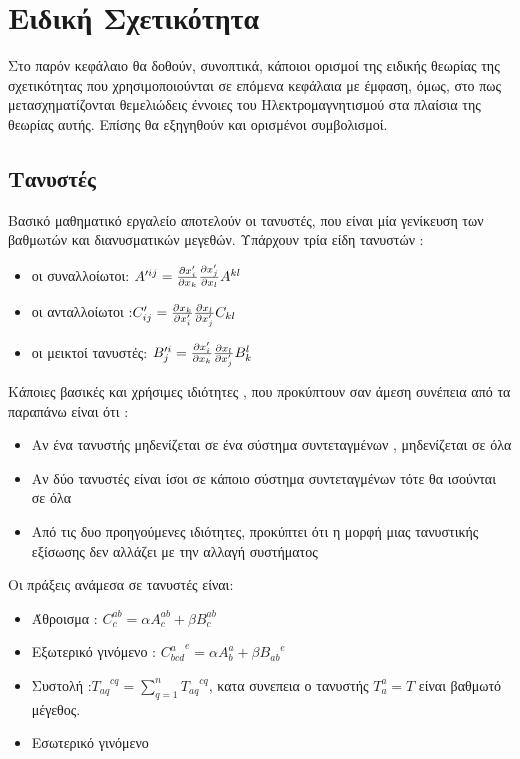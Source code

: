 \section{Ειδική Σχετικότητα}

Στο παρόν κεφάλαιο θα δοθούν, συνοπτικά, κάποιοι ορισμοί της ειδικής θεωρίας της σχετικότητας που χρησιμοποιούνται σε επόμενα κεφάλαια με έμφαση, όμως, στο  πως μετασχηματίζονται θεμελιώδεις έννοιες του Ηλεκτρομαγνητισμού στα πλαίσια της θεωρίας αυτής. Επίσης θα εξηγηθούν και ορισμένοι συμβολισμοί. 

\subsection{Τανυστές}


Βασικό μαθηματικό εργαλείο αποτελούν οι τανυστές, που είναι μία γενίκευση των βαθμωτών και διανυσματικών μεγεθών. Υπάρχουν τρία είδη τανυστών :

\begin{itemize}
\item οι συναλλοίωτοι: $ A'^{ij} = \frac{\partial x'_i }{\partial x_k} \frac{\partial x'_j}{\partial x_l} A^{kl} $
\item οι ανταλλοίωτοι :$ C'_{ij} = \frac{\partial x_k}{\partial x'_i} \frac{\partial x_l}{\partial x'_j}C_{kl}$ 
\item οι μεικτοί τανυστές: $ B'^i_j  =\frac{\partial x'_i }{\partial x_k} \frac{\partial x_l}{\partial x'_j} B^l_k  $
\end{itemize}

Κάποιες βασικές και χρήσιμες ιδιότητες , που προκύπτουν σαν άμεση συνέπεια από τα παραπάνω είναι ότι :

\begin{itemize}
\item Αν ένα τανυστής μηδενίζεται σε ένα σύστημα συντεταγμένων , μηδενίζεται σε όλα 
\item Αν δύο τανυστές είναι ίσοι σε κάποιο σύστημα συντεταγμένων τότε θα ισούνται σε όλα 
\item Από τις δυο προηγούμενες ιδιότητες, προκύπτει ότι η μορφή μιας τανυστικής εξίσωσης δεν αλλάζει με την αλλαγή συστήματος 
\end{itemize}
	
Οι πράξεις ανάμεσα σε τανυστές είναι: 

\begin{itemize}
\item Άθροισμα : $C^{ab}_c = \alpha A^{ab}_c +\beta B^{ab}_c $ 
\item Εξωτερικό γινόμενο : ${C^{a}_{bcd}}^e = \alpha A^{a}_b +\beta {B_{ab}}^{e} $ 
\item Συστολή :$ {T_{aq}}^{cq} = \sum\limits_{q=1}^n {T_{aq}}^{cq} $, κατα συνεπεια ο τανυστής $ T^a_a = T $ είναι βαθμωτό μέγεθος.  \
\item Εσωτερικό γινόμενο 
\end{itemize}


